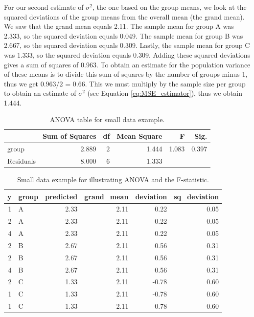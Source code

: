 \documentclass[]{book}\usepackage[]{graphicx}\usepackage[]{color}
\begin{document}
For our second estimate of $\sigma^2$, the one based on the group means, we look at the squared deviations of the group means from the overall mean (the grand mean). We saw that the grand mean equals 2.11. The sample mean for group A was 2.333, so the squared deviation equals 0.049. The sample mean for group B was 2.667, so the squared deviation equals 0.309. Lastly, the sample mean for group C was 1.333, so the squared deviation equals 0.309. Adding these squared deviations gives a sum of squares of 0.963. To obtain an estimate for the population variance of these means is to divide this sum of squares by the number of groups minus 1, thus we get 0.963/2 = 0.66. This we must multiply by the sample size per group to obtain an estimate of $\sigma^2$ (see Equation \ref{eq:MSE_estimator}), thus we obtain 1.444.











\begin{table}[ht]
\centering
\caption{ANOVA table for small data example.} 
\label{tab:anova_table}
\begin{tabular}{lrrrrr}
  \hline
 & Sum of Squares & df & Mean Square & F & Sig. \\ 
  \hline
group & 2.889 & 2 & 1.444 & 1.083 & 0.397 \\ 
  Residuals & 8.000 & 6 & 1.333 &  &  \\ 
   \hline
\end{tabular}
\end{table}



\begin{table}[ht]
\centering
\caption{Small data example for illustrating ANOVA and the F-statistic.} 
\label{tab:anova_data2}
\begin{tabular}{rlrrrr}
  \hline
y & group & predicted & grand\_mean & deviation & sq\_deviation \\ 
  \hline
1 & A & 2.33 & 2.11 & 0.22 & 0.05 \\ 
  2 & A & 2.33 & 2.11 & 0.22 & 0.05 \\ 
  4 & A & 2.33 & 2.11 & 0.22 & 0.05 \\ 
  2 & B & 2.67 & 2.11 & 0.56 & 0.31 \\ 
  2 & B & 2.67 & 2.11 & 0.56 & 0.31 \\ 
  4 & B & 2.67 & 2.11 & 0.56 & 0.31 \\ 
  2 & C & 1.33 & 2.11 & -0.78 & 0.60 \\ 
  1 & C & 1.33 & 2.11 & -0.78 & 0.60 \\ 
  1 & C & 1.33 & 2.11 & -0.78 & 0.60 \\ 
   \hline
\end{tabular}
\end{table}
\end{document}
